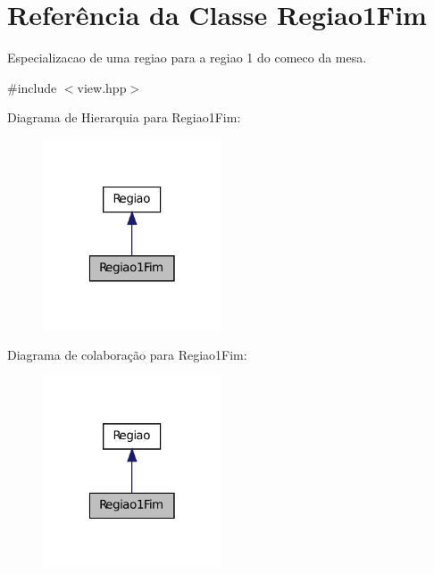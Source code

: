 \hypertarget{classRegiao1Fim}{
\section{Referência da Classe Regiao1Fim}
\label{classRegiao1Fim}
}


Especializacao de uma regiao para a regiao 1 do comeco da mesa.  




{\ttfamily \#include $<$view.hpp$>$}



Diagrama de Hierarquia para Regiao1Fim:\nopagebreak
\begin{figure}[H]
\begin{center}
\leavevmode
\includegraphics[width=150pt]{classRegiao1Fim__inherit__graph}
\end{center}
\end{figure}


Diagrama de colaboração para Regiao1Fim:\nopagebreak
\begin{figure}[H]
\begin{center}
\leavevmode
\includegraphics[width=150pt]{classRegiao1Fim__coll__graph}
\end{center}
\end{figure}

